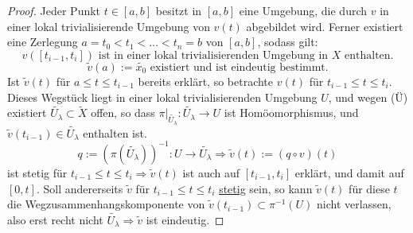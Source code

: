 \documentclass[a4paper,11pt,notitlepage]{report}
\theoremstyle{definition}
\begin{document}
\begin{proof}
	Jeder Punkt $t \in [a,b]$ besitzt in $[a,b]$ eine Umgebung, die durch $v$ in einer lokal trivialisierende Umgebung von $v(t)$ abgebildet wird. Ferner existiert eine Zerlegung $a = t_0 < t_1 < \ldots < t_n = b$ von $[a,b]$, sodass gilt:
	$$v([t_{i-1}, t_i]) \text{ ist in einer lokal trivialisierenden Umgebung in $X$ enthalten.}$$
	$$\widetilde{v}(a):= \widetilde{x_0} \text{ existiert und ist eindeutig bestimmt.}$$
	Ist $\widetilde{v}(t)$ für $a \leq t \leq t_{i-1}$ bereits erklärt, so betrachte $v(t)$ für $t_{i-1} \leq t \leq t_i$. Dieses Wegstück liegt in einer lokal trivialisierenden Umgebung $U$, und wegen (Ü) existiert $\widetilde{U_\lambda} \subset \widetilde{X}$ offen, so dass $\pi \big |_{\widetilde{U_\lambda}} \colon \widetilde{U_\lambda} \rightarrow U$ ist Homöomorphismus, und $\widetilde{v}(t_{i-1}) \in \widetilde{U_\lambda}$ enthalten ist.
	$$q := (\pi(\widetilde{U_\lambda}))^{-1} \colon U \rightarrow \widetilde{U_\lambda} \Rightarrow \widetilde{v}(t) := (q \circ v)(t)$$
	ist stetig für $t_{i-1} \leq t \leq t_i \Rightarrow \widetilde{v}(t)$ ist auch auf $[t_{i-1},t_i]$ erklärt, und damit auf $[0,t]$.
	\newline
	Soll andererseits $\widetilde{v}$ für $t_{i-1} \leq t \leq t_i$ \underline{stetig} sein, so kann $\widetilde{v}(t)$ für diese $t$ die Wegzusammenhangskomponente von $\widetilde{v}(t_{i-1}) \subset \pi^{-1}(U)$ nicht verlassen, also erst recht nicht $\widetilde{U_\lambda} \Rightarrow \widetilde{v}$ ist eindeutig.
\end{proof}
\end{document}
